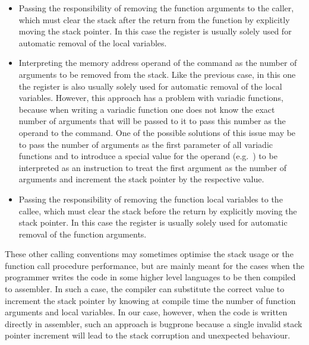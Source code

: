 \begin{itemize}
    \item Passing the responsibility of removing the function arguments
    to the caller, which must clear the stack after the return from
    the function by explicitly moving the stack pointer.
    In this case the  register is usually solely used for automatic
    removal of the local variables.

    \item Interpreting the memory address operand of the  command
    as the number of arguments to be removed from the stack.
    Like the previous case, in this one the  register is also usually
    solely used for automatic removal of the local variables.
    However, this approach has a problem with variadic functions, because when
    writing a variadic function one does not know the exact number of arguments
    that will be passed to it to pass this number as the operand to the 
    command.
    One of the possible solutions of this issue may be to pass the number
    of arguments as the first parameter of all variadic functions and
    to introduce a special value for the  operand (e.g.\ )
    to be interpreted as an instruction to treat the first argument as
    the number of arguments and increment the stack pointer
    by the respective value.

    \item Passing the responsibility of removing the function local variables
    to the callee, which must clear the stack before the return
    by explicitly moving the stack pointer.
    In this case the  register is usually solely used for automatic
    removal of the function arguments.
\end{itemize}

These other calling conventions may sometimes optimise the stack usage
or the function call procedure performance, but are mainly meant for
the cases when the programmer writes the code in some higher level languages
to be then compiled to assembler.
In such a case, the compiler can substitute the correct value to increment
the stack pointer by knowing at compile time the number of function arguments
and local variables.
In our case, however, when the code is written directly in assembler, such
an approach is bugprone because a single invalid stack pointer increment
will lead to the stack corruption and unexpected behaviour.
